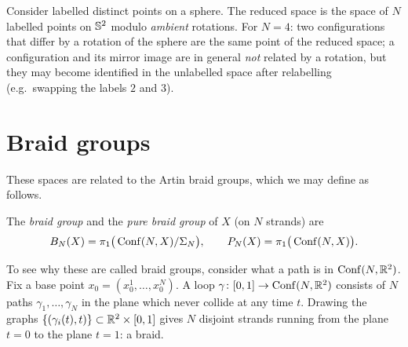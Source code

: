 \begin{example}
\label{L07:ex:confS2}
Consider labelled distinct points on a sphere. The reduced space is the space of $N$
labelled points on $\mathbb{S}^2$ modulo \emph{ambient} rotations.
For $N=4$: two configurations that differ by a rotation of the sphere are the same point of
the reduced space; a configuration and its mirror image are in general \emph{not} related by
a rotation, but they may become identified in the unlabelled space after relabelling
(e.g.\ swapping the labels $2$ and $3$).
\end{example}

\section{Braid groups}
\label{L07:sec:braid}

These spaces are related to the Artin braid groups, which we may define as follows.

\begin{definition}
\label{L07:def:braid}
The \emph{braid group} and the \emph{pure braid group} of $X$ (on $N$ strands) are
\[
  B_N(X) = \pi_1\big(\operatorname{Conf}(N,X)/\Sigma_N\big),
  \qquad
  P_N(X) = \pi_1\big(\operatorname{Conf}(N,X)\big).
\]
\end{definition}

To see why these are called braid groups, consider what a path is in $\operatorname{Conf}(N,\mathbb{R}^2)$.
Fix a base point $x_0=(x_0^1,\dots,x_0^N)$. A loop $\gamma\colon[0,1]\to\operatorname{Conf}(N,\mathbb{R}^2)$
consists of $N$ paths $\gamma_1,\dots,\gamma_N$ in the plane which never collide at any
time $t$. Drawing the graphs $\{(\gamma_i(t),t)\}\subset\mathbb{R}^2\times[0,1]$ gives $N$
disjoint strands running from the plane $t=0$ to the plane $t=1$: a braid.

